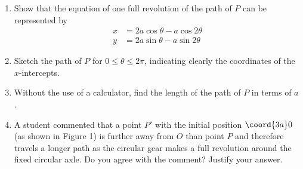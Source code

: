 \documentclass{jhwhw}
\begin{document}
        \begin{enumerate}
            \item Show that the equation of one full revolution of the path of $P$ can be represented by
            \begin{align*}
                x &= 2a\cos\theta - a\cos2\theta\\
                y &= 2a\sin\theta - a\sin2\theta
            \end{align*}
            \item Sketch the path of $P$ for $0 \leq \theta \leq 2\pi$, indicating clearly the coordinates of the $x$-intercepts.
            \item Without the use of a calculator, find the length of the path of $P$ in terms of $a$.
            \item A student commented that a point $P'$ with the initial position $\coord{3a}0$ (as shown in Figure 1) is further away from $O$ than point $P$ and therefore travels a longer path as the circular gear makes a full revolution around the fixed circular axle. Do you agree with the comment? Justify your answer.
        \end{enumerate}

    \solution
\end{document}
